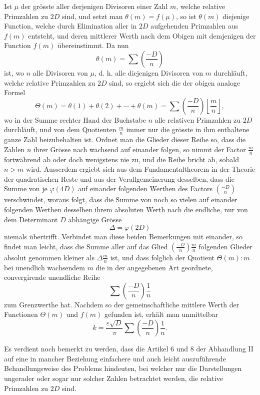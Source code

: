 \documentclass[12pt]{article}
\begin{document}
Ist \(\mu\) der grösste aller derjenigen Divisoren einer Zahl \(m\), welche relative Primzahlen zu \(2D\) sind, und setzt man \(\theta(m)=f(\mu)\), so ist \(\theta(m)\) diejenige Function, welche durch Elimination aller in \(2D\) aufgehenden Primzahlen aus \(f(m)\) entsteht, und deren mittlerer Werth nach dem Obigen mit demjenigen der Function \(f(m)\) übereinstimmt. Da nun
\[
\theta(m)=\sum\left(\frac{-D}{n}\right)
\]
ist, wo \(n\) alle Divisoren von \(\mu\), d. h. alle diejenigen Divisoren von \(m\) durchläuft, welche relative Primzahlen zu \(2D\) sind, so ergiebt sich die der obigen analoge Formel
\[
\Theta(m)=\theta(1)+\theta(2)+\cdots+\theta(m)
=\sum\left(\frac{-D}{n}\right)\left\lfloor\frac mn\right\rfloor,
\]
wo in der Summe rechter Hand der Buchstabe \(n\) alle relativen Primzahlen zu \(2D\) durchläuft, und von dem Quotienten \(\frac mn\) immer nur die grösste in ihm enthaltene ganze Zahl beizubehalten ist. Ordnet man die Glieder dieser Reihe so, dass die Zahlen \(n\) ihrer Grösse nach wachsend auf einander folgen, so nimmt der Factor \(\frac mn\) fortwährend ab oder doch wenigstens nie zu, und die Reihe bricht ab, sobald \(n>m\) wird. Ausserdem ergiebt sich aus dem Fundamentaltheorem in der Theorie der quadratischen Reste und aus der Verallgemeinerung desselben, dass die Summe von je \(\varphi(4D)\) auf einander folgenden Werthen des Factors \(\left(\frac{-D}{n}\right)\) verschwindet, woraus folgt, dass die Summe von noch so vielen auf einander folgenden Werthen desselben ihrem absoluten Werth nach die endliche, nur von dem Determinant \(D\) abhängige Grösse
\[
\Delta=\varphi(2D)
\]
niemals übertrifft. Verbindet man diese beiden Bemerkungen mit einander, so findet man leicht, dass die Summe aller auf das Glied \(\left(\frac{-D}{n}\right)\frac mn\) folgenden Glieder absolut genommen kleiner als \(\Delta\frac mn\) ist, und dass folglich der Quotient \(\Theta(m):m\) bei unendlich wachsendem \(m\) die in der angegebenen Art geordnete, convergirende unendliche Reihe
\[
\sum\left(\frac{-D}{n}\right)\frac1n
\]
zum Grenzwerthe hat. Nachdem so der gemeinschaftliche mittlere Werth der Functionen \(\Theta(m)\) und \(f(m)\) gefunden ist, erhält man unmittelbar
\[
k=\frac{\varepsilon\sqrt D}{\pi}\sum\left(\frac{-D}{n}\right)\frac1n.
\]

Es verdient noch bemerkt zu werden, dass die Artikel 6 und 8 der Abhandlung II auf eine in mancher Beziehung einfachere und auch leicht auszuführende Behandlungsweise des Problems hindeuten, bei welcher nur die Darstellungen ungerader oder sogar nur solcher Zahlen betrachtet werden, die relative Primzahlen zu \(2D\) sind.
\end{document}
